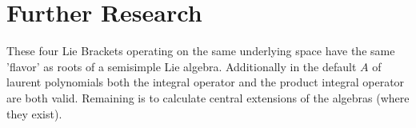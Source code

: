 \documentclass[10pt, oneside]{article}
\begin{document}
   \section{Further Research}
   These four Lie Brackets operating on the same underlying space have the same 'flavor' as roots of a semisimple Lie algebra. 
   Additionally in the default $A$ of laurent polynomials both the integral operator and the product integral operator are both valid. 
   Remaining is to calculate central extensions of the algebras (where they exist).
\end{document}

